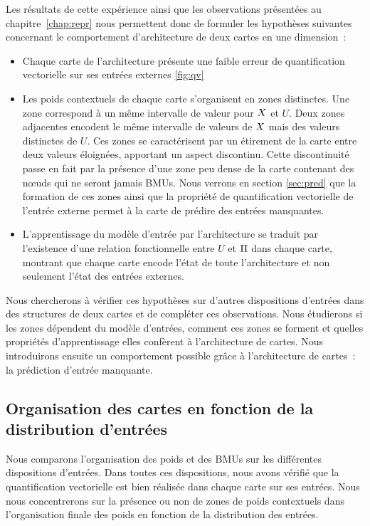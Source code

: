 \documentclass[../main]{subfiles}
\begin{document}
Les résultats de cette expérience ainsi que les observations présentées au chapitre~\ref{chap:repr} nous permettent donc de formuler les hypothèses suivantes concernant le comportement d'architecture de deux cartes en une dimension~:

\begin{itemize}
	\item Chaque carte de l'architecture présente une faible erreur de quantification vectorielle sur ses entrées externes \ref{fig:qv}
	\item Les poids contextuels de chaque carte s'organisent en zones distinctes. Une zone correspond à un même intervalle de valeur pour $X$ et $U$. Deux zones adjacentes encodent le même intervalle de valeurs de $X$ mais des valeurs distinctes de $U$. Ces zones se caractérisent par un étirement de la carte entre deux valeurs éloignées, apportant un aspect discontinu. Cette discontinuité passe en fait par la présence d'une zone peu dense de la carte contenant des n\oe{}uds qui ne seront jamais BMUs. Nous verrons en section \ref{sec:pred} que la formation de ces zones ainsi que la propriété de quantification vectorielle de l'entrée externe permet à la carte de prédire des entrées manquantes.
	\item L'apprentissage du modèle d'entrée par l'architecture se traduit par l'existence d'une relation fonctionnelle entre $U$ et $\Pi$ dans chaque carte, montrant que chaque carte encode l'état de toute l'architecture et non seulement l'état des entrées externes.
\end{itemize}

Nous chercherons à vérifier ces hypothèses sur d'autres dispositions d'entrées dans des structures de deux cartes et de compléter ces observations.
Nous étudierons si les zones dépendent du modèle d'entrées, comment ces zones se forment et quelles propriétés d'apprentissage elles confèrent à l'architecture de cartes.
Nous introduirons ensuite un comportement possible grâce à l'architecture de cartes~: la prédiction d'entrée manquante.

\subsection{Organisation des cartes en fonction de la distribution d'entrées}
Nous comparons l'organisation des poids et des BMUs sur les différentes dispositions d'entrées.
Dans toutes ces dispositions, nous avons vérifié que la quantification vectorielle est bien réalisée dans chaque carte sur ses entrées. Nous nous concentrerons sur la présence ou non de zones de poids contextuels dans l'organisation finale des poids en fonction de la distribution des entrées.
\end{document}
